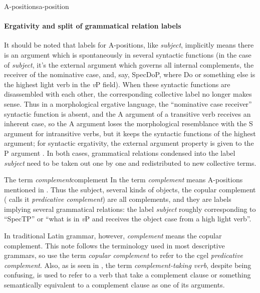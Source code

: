 \documentclass[a4paper, oneside]{report}
\newcommand*{\term}[1]{\emph{#1}}
\newcommand{\vP}{\textit{v}P}
\begin{document}
\begin{theorybox}{A-positions}{a-position}
    \paragraph*{Ergativity and split of grammatical relation labels}
    It should be noted that labels for A-positions, like \term{subject},
    implicitly means there is an argument which is spontaneously in several syntactic functions
    (in the case of \term{subject}, 
    it's the external argument which governs all internal complements, 
    the receiver of the nominative case, and, say, SpecDoP, 
    where Do or something else is the highest light verb in the \vP{} field).
    When these syntactic functions are disassembled with each other, 
    the corresponding collective label no longer makes sense.
    Thus in a morphological ergative language, 
    the ``nominative case receiver'' syntactic function is absent, 
    and the A argument of a transitive verb receives an inherent case, 
    so the A argument loses the morphological resemblance with the 
    S argument for intransitive verbs, 
    but it keeps the syntactic functions of 
    the highest argument; 
    for syntactic ergativity, 
    the external argument property is given to the P argument \citep{aldridge2008generative}.
    In both cases, grammatical relations condensed into the label \term{subject} 
    need to be taken out one by one and redistributed to new collective terms.
\end{theorybox}

\begin{infobox}{The term \term{complement}}{complement}
    In \citet{cgel} the term \term{complement} 
    means A-positions mentioned in .
    Thus the subject, several kinds of objects,
    the copular complement (\cite{cgel} calls it \term{predicative complement}) are all complements,
    and they are labels implying several grammatical relations:
    the label \term{subject} roughly corresponding to ``SpecTP'' or ``what is in \vP{} 
    and receives the object case from a high light verb''.

    In traditional Latin grammar, however, \term{complement} means the copular complement. 
    This note follows the terminology used in most descriptive grammars,
    so use the term \term{copular complement} to refer to the \ac{cgel} \term{predicative complement}.
    Also, as is seen in , 
    the term \term{complement-taking verb}, despite being confusing,
    is used to refer to a verb that take a complement clause 
    or something semantically equivalent to a complement clause
    as one of its arguments.
\end{infobox}
\end{document}
